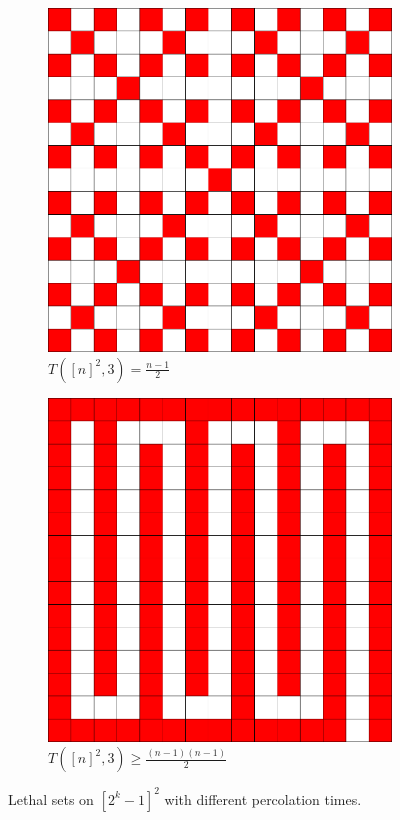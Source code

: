 \begin{figure}[]
\centering
\begin{subfigure}{0.4\textwidth}
	\includegraphics[width=\textwidth]{figures/1/15x15x1.pdf}
	\caption{$T([n]^2,3) = \frac{n-1}{2}$}
	\label{fig:fast}
\end{subfigure} \hfill%
\begin{subfigure}{0.4\textwidth}
	\includegraphics[width=\textwidth]{figures/1/15x15x1_slow.pdf}
	\caption{$T([n]^2,3) \geq \frac{(n-1)(n-1)}{2}$}
	\label{fig:slow}
\end{subfigure}
\caption{Lethal sets on $[2^k-1]^2$ with different percolation times.}
\label{fig:percolation_time}
\end{figure} 

